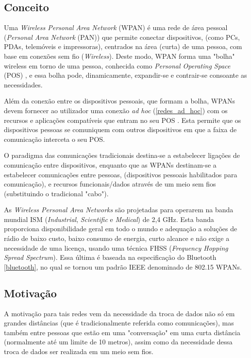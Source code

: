 \documentclass[conference]{IEEEtran}
\begin{document}
\subsection{Conceito}

Uma \textit{Wireless Personal Area Network} (WPAN) é uma rede de área pessoal (\textit{Personal Area Network} (PAN)) que permite conectar dispositivos, (como PCs, PDAs, telemóveis e impressoras), centrados na área (curta) de uma pessoa, com base em conexões sem fio (\textit{Wireless}). Deste modo, WPAN forma uma "bolha" wireless em torno de uma pessoa, conhecida como \textit{Personal Operating Space} (POS) \cite{prasad2004ofdm}, e essa bolha pode, dinamicamente, expandir-se e contrair-se consoante as necessidades.

Além da conexão entre os dispositivos pessoais, que formam a bolha, WPANs devem fornecer ao utilizador uma conexão \textit{ad hoc} (\ref{redes_ad_hoc}) com os recursos e aplicações compatíveis que entram no seu POS \cite{prasad2004ofdm}.
Esta permite que os dispositivos pessoas se comuniquem com outros dispositivos em que a faixa de comunicação interceta o seu POS.

O paradigma das comunicações tradicionais destina-se a estabelecer ligações de comunicação entre dispositivos, enquanto que as WPANs destinam-se a estabelecer comunicações entre pessoas, (dispositivos pessoais habilitados para comunicação), e recursos funcionais/dados através de um meio sem fios (substituindo o tradicional "cabo").

As \textit{Wireless Personal Area Networks} são projetadas para operarem na banda mundial ISM (\textit{Industrial}, \textit{Scientific} e \textit{Medical}) de 2,4 GHz. Esta banda proporciona disponibilidade geral em todo o mundo e adequação a soluções de rádio de baixo custo, baixo consumo de energia, curto alcance e não exige a necessidade de uma licença, usando uma técnica FHSS (\textit{Frequency Hopping Spread Spectrum}). Essa última é baseada na especificação do Bluetooth \ref{bluetooth}, no qual se tornou um padrão IEEE denominado de 802.15 WPANs. %


\subsection{Motivação}

A motivação para tais redes vem da necessidade da troca de dados não só em grandes distâncias (que é tradicionalmente referida como comunicações), mas também entre pessoas que estão em uma "conversação" em uma curta distância (normalmente até um limite de 10 metros), assim como da necessidade dessa troca de dados ser realizada em um meio sem fios.
\end{document}
